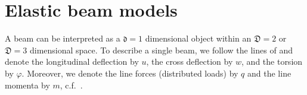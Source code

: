 \documentclass[a4paper, english, 12pt, reqno, draft]{amsart}
\theoremstyle{definition}
\theoremstyle{remark}
\numberwithin{equation}{section}
\newcommand{\locDim}{\ensuremath{\mathfrak d}}
\newcommand{\globDim}{\ensuremath{\mathfrak D}}
\newcommand{\longDef}{\ensuremath{u}}
\newcommand{\crossDef}{\ensuremath{w}}
\newcommand{\torsion}{\ensuremath{\varphi}}
\newcommand{\force}{\ensuremath{q}}
\newcommand{\momentum}{\ensuremath{m}}
\begin{document}
% 
% 
% 
\section{Elastic beam models}
% 
A beam can be interpreted as a $\locDim = 1$ dimensional object within an $\globDim = 2$ or $\globDim = 3$ dimensional space. To describe a single beam, we follow the lines of \cite[Sect.~1.2.3]{MeskourisH2013} and denote the longitudinal deflection by $\longDef$, the cross deflection by $\crossDef$, and the torsion by $\torsion$. Moreover, we denote the line forces (distributed loads) by $\force$ and the line momenta by $\momentum$, c.f.~\cite[Sect.~1.2.2]{MeskourisH2013}.
% 
\end{document}
